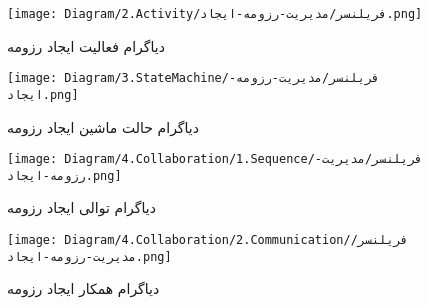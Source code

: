 \begin{figure}[H]
	\centering
	\texttt{[image: Diagram/2.Activity/فریلنسر/مدیریت-رزومه-ایجاد.png]}
	\caption{دیاگرام فعالیت ایجاد رزومه}
	\label{fig:a:ایجاد-رزومه}
\end{figure}
\begin{figure}[H]
	\centering
	\texttt{[image: Diagram/3.StateMachine/فریلنسر/مدیریت-رزومه-ایجاد.png]}
	\caption{دیاگرام حالت ماشین ایجاد رزومه}
	\label{fig:sm:ایجاد-رزومه}
\end{figure}
\begin{figure}[H]
	\centering
	\texttt{[image: Diagram/4.Collaboration/1.Sequence/فریلنسر/مدیریت-رزومه-ایجاد.png]}
	\caption{دیاگرام توالی ایجاد رزومه}
	\label{fig:s:ایجاد-رزومه}
\end{figure}
\begin{figure}[H]
	\centering
	\texttt{[image: Diagram/4.Collaboration/2.Communication/فریلنسر/مدیریت-رزومه-ایجاد.png]}
	\caption{دیاگرام همکار ایجاد رزومه}
	\label{fig:c:ایجاد-رزومه}
\end{figure}
